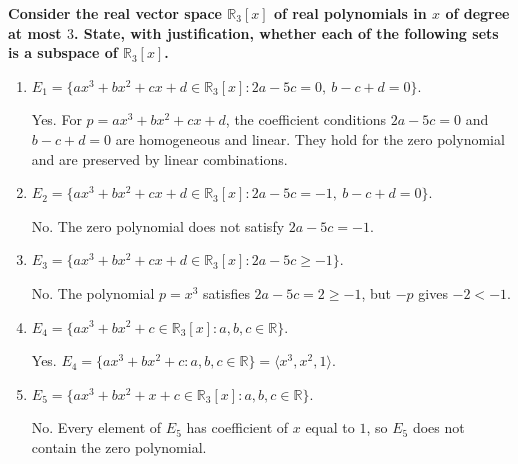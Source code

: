 \providecommand{\rank}{\operatorname{r}}
\providecommand{\RR}{\mathbb R}
\providecommand{\CC}{\mathbb C}
\providecommand{\KK}{\mathbb K}

\setcounter{enumi}{63}
\item {\bfseries\boldmath
Consider the real vector space $\RR_3[x]$ of real polynomials in $x$ of degree at most $3$. State, with justification, whether each of the following sets is a subspace of $\RR_3[x]$.
}

\begin{enumerate}[label=\alph*)]

\item $E_1=\{ax^3+bx^2+cx+d\in\RR_3[x]:2a-5c=0,\ b-c+d=0\}$.

\begin{answer}
Yes. For $p=ax^3+bx^2+cx+d$, the coefficient conditions
$2a-5c=0$ and $b-c+d=0$ are homogeneous and linear. They hold for the zero
polynomial and are preserved by linear combinations.
\end{answer}

\item $E_2=\{ax^3+bx^2+cx+d\in\RR_3[x]:2a-5c=-1,\ b-c+d=0\}$.

\begin{answer}
No. The zero polynomial does not satisfy $2a-5c=-1$.
\end{answer}

\item $E_3=\{ax^3+bx^2+cx+d\in\RR_3[x]:2a-5c\ge-1\}$.

\begin{answer}
No. The polynomial $p=x^3$ satisfies $2a-5c=2\ge-1$,
but $-p$ gives $-2<-1$.
\end{answer}

\item $E_4=\{ax^3+bx^2+c\in\RR_3[x]:a,b,c\in\RR\}$.

\begin{answer}
Yes. $E_4=\{ax^3+bx^2+c:a,b,c\in\RR\}=\langle x^3,x^2,1\rangle$.
\end{answer}

\item $E_5=\{ax^3+bx^2+x+c\in\RR_3[x]:a,b,c\in\RR\}$.

\begin{answer}
No. Every element of $E_5$ has coefficient of $x$ equal to $1$,
so $E_5$ does not contain the zero polynomial.
\end{answer}
\end{enumerate}
